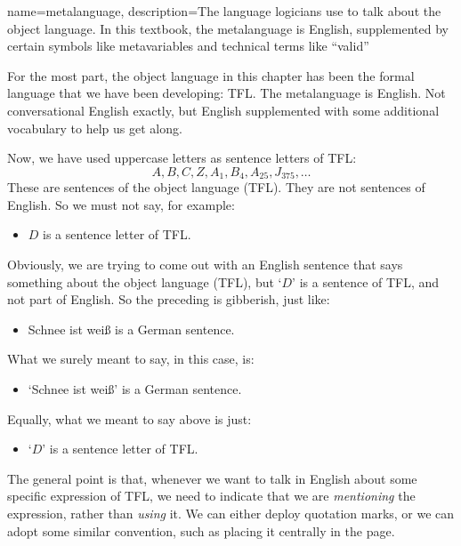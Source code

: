 {
name=metalanguage,
description={The language logicians use to talk about the object language. In this textbook, the metalanguage is English, supplemented by certain symbols like metavariables and technical terms like ``valid''}
}

For the most part, the object language in this chapter has been the formal language that we have been developing: TFL. The metalanguage is English. Not conversational English exactly, but English supplemented with some additional vocabulary to help us get along.

Now, we have used uppercase letters as sentence letters of TFL:
	$$A, B, C, Z, A_1, B_4, A_{25}, J_{375},\ldots$$
These are sentences of the object language (TFL). They are not sentences of English. So we must not say, for example:
	\begin{itemize}
		\item $D$ is a sentence letter of TFL.
	\end{itemize}
Obviously, we are trying to come out with an English sentence that says something about the object language (TFL), but `$D$' is a sentence of TFL, and not part of English. So the preceding is gibberish, just like:
	\begin{itemize}
		\item \foreignlanguage{german}{Schnee ist weiß} is a German sentence.
	\end{itemize}
What we surely meant to say, in this case, is:
	\begin{itemize}
		\item `\foreignlanguage{german}{Schnee ist weiß}' is a German sentence.
	\end{itemize}
Equally, what we meant to say above is just:
	\begin{itemize}
		\item `$D$' is a sentence letter of TFL.
	\end{itemize}
The general point is that, whenever we want to talk in English about some specific expression of TFL, we need to indicate that we are \emph{mentioning} the expression, rather than \emph{using} it. We can either deploy quotation marks, or we can adopt some similar convention, such as  placing it centrally in the page.


